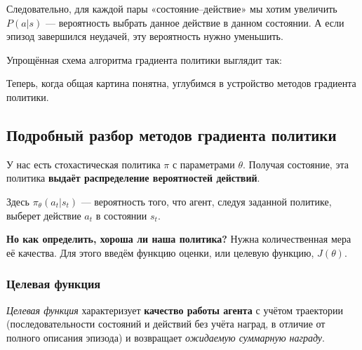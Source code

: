 \documentclass[11pt,a4paper]{article}
\begin{document}
Следовательно, для каждой пары «состояние--действие» мы хотим увеличить \(P(a|s)\) --- вероятность выбрать данное действие в данном состоянии. А если эпизод завершился неудачей, эту вероятность нужно уменьшить.

Упрощённая схема алгоритма градиента политики выглядит так:


Теперь, когда общая картина понятна, углубимся в устройство методов градиента политики.

\subsection{Подробный разбор методов градиента политики}\label{diving-deeper-into-policy-gradient-methods-1}

У нас есть стохастическая политика \(\pi\) с параметрами \(\theta\). Получая состояние, эта политика \textbf{выдаёт распределение вероятностей действий}.


Здесь \(\pi_\theta(a_t|s_t)\) --- вероятность того, что агент, следуя заданной политике, выберет действие \(a_t\) в состоянии \(s_t\).

\textbf{Но как определить, хороша ли наша политика?} Нужна количественная мера её качества. Для этого введём функцию оценки, или целевую функцию, \(J(\theta)\).

\subsubsection{Целевая функция}\label{the-objective-function}

\emph{Целевая функция} характеризует \textbf{качество работы агента} с учётом траектории (последовательности состояний и действий без учёта наград, в отличие от полного описания эпизода) и возвращает \emph{ожидаемую суммарную награду}.

\end{document}
